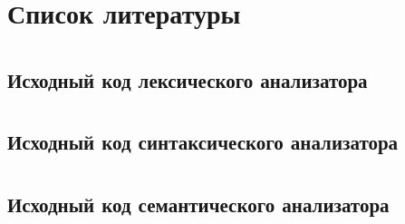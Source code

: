 \documentclass[a4paper,12pt]{article}
\numberwithin{equation}{section}
\begin{document}
\section{Список литературы}
\printbibliography[heading=none]

\section*{} 
\subsection*{Исходный код лексического анализатора}

\clearpage

\section*{} 
\subsection*{Исходный код синтаксического анализатора}

\clearpage

\section*{} 
\subsection*{Исходный код семантического анализатора}

\clearpage
\end{document}
